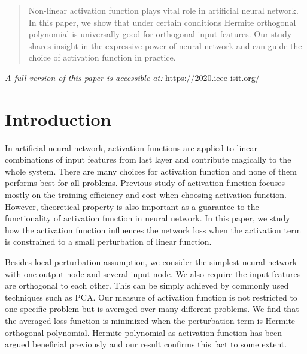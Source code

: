 \documentclass[conference,letterpaper]{IEEEtran}
\begin{document}
\begin{abstract}
Non-linear activation function plays vital role in artificial neural network.
In this paper, we show that under certain conditions Hermite orthogonal polynomial
is universally good for orthogonal input features. Our study shares insight in the expressive
power of neural network and can guide the choice of activation function in practice.
\end{abstract}


\textit{A full version of this paper is accessible at:}
\url{https://2020.ieee-isit.org/} 

\section{Introduction}
In artificial neural network, activation functions are applied to linear combinations of input features from last layer and contribute magically to the whole system.
There are many choices for activation function \cite{laudani2015training} and none of them performs best for all problems.
Previous study of activation function focuses mostly on the training efficiency and cost when choosing activation function.
However, theoretical property is also important as a guarantee to the functionality of activation function in neural network.
In this paper, we study how the activation function influences the network loss
when the activation term is constrained to a small perturbation of linear function.

Besides local perturbation assumption, we consider the simplest neural network with one output node and several input node.
We also require the input features are orthogonal to each other.
This can be simply achieved by commonly used techniques such as PCA.
Our measure of activation function is not restricted to one specific problem but is averaged over many different problems.
We find that the averaged loss function is minimized when the perturbation term is Hermite orthogonal polynomial.
Hermite polynomial as activation function has been argued beneficial previously \cite{ma2005constructive} and our result confirms this fact to some extent.
\end{document}
